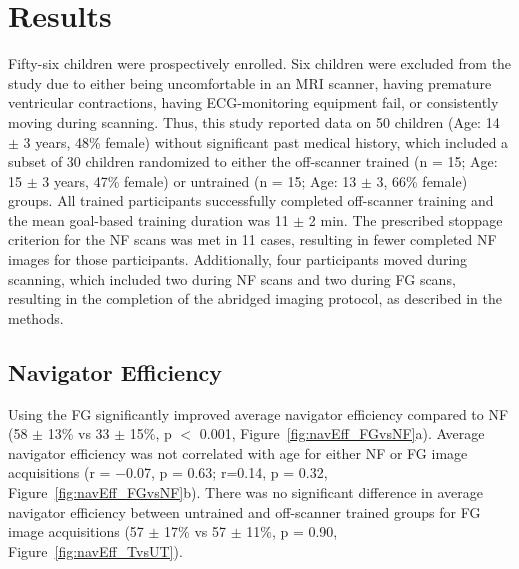 \section{Results}
	Fifty-six children were prospectively enrolled. Six children were excluded from the study due to either being uncomfortable in an MRI scanner, having premature ventricular contractions, having ECG-monitoring equipment fail, or consistently moving during scanning. Thus, this study reported data on 50 children (Age: 14 $\pm$ 3 years, 48\% female) without significant past medical history, which included a subset of 30 children randomized to either the off-scanner trained (n = 15; Age: 15 $\pm$ 3 years, 47\% female) or untrained (n = 15; Age: 13 $\pm$ 3, 66\% female) groups. All trained participants successfully completed off-scanner training and the mean goal-based training duration was 11 $\pm$ 2 min. The prescribed stoppage criterion for the NF scans was met in 11 cases, resulting in fewer completed NF images for those participants. Additionally, four participants moved during scanning, which included two during NF scans and two during FG scans, resulting in the completion of the abridged imaging protocol, as described in the methods.

\subsection{Navigator Efficiency}
	Using the FG significantly improved average navigator efficiency compared to NF (58 $\pm$ 13\% vs 33 $\pm$ 15\%, p $<$ 0.001, Figure~\ref{fig:navEff_FGvsNF}a). Average navigator efficiency was not correlated with age for either NF or FG image acquisitions (r = −0.07, p = 0.63; r=0.14, p = 0.32, Figure~\ref{fig:navEff_FGvsNF}b). There was no significant difference in average navigator efficiency between untrained and off-scanner trained groups for FG image acquisitions (57 $\pm$ 17\% vs 57 $\pm$ 11\%, p = 0.90, Figure~\ref{fig:navEff_TvsUT}).
	
